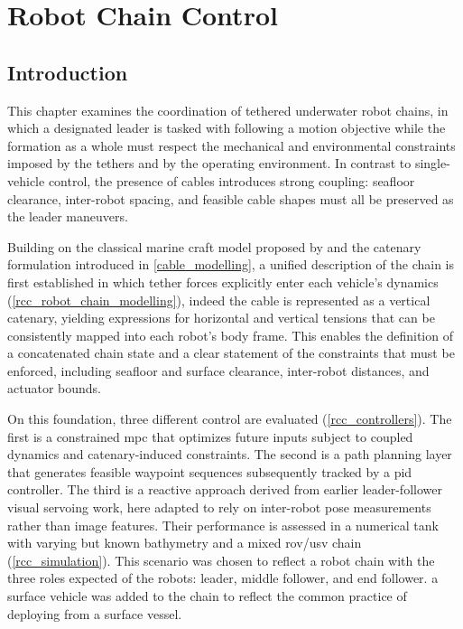 \chapter{Robot Chain Control}
\label{robot_chain_control}

\minitoc{}

\section{Introduction}
\label{rcc_introduction}

This chapter examines the coordination of tethered underwater robot chains, in which a designated
leader is tasked with following a motion objective while the formation as a whole must respect the
mechanical and environmental constraints imposed by the tethers and by the operating environment.
In contrast to single-vehicle control, the presence of cables introduces strong coupling: seafloor
clearance, inter-robot spacing, and feasible cable shapes must all be preserved as the leader
maneuvers.

Building on the classical marine craft model proposed by \cite{fossenHandbookMarineCraft2011} and
the catenary formulation introduced in \cref{cable_modelling}, a unified description of the chain
is first established in which tether forces explicitly enter each vehicle's dynamics
(\cref{rcc_robot_chain_modelling}), indeed the cable is represented as a vertical catenary,
yielding expressions for horizontal and vertical tensions that can be consistently mapped into each
robot's body frame. This enables the definition of a concatenated chain state and a clear statement
of the constraints that must be enforced, including seafloor and surface clearance, inter-robot
distances, and actuator bounds.

On this foundation, three different control are evaluated (\cref{rcc_controllers}). The first is a
constrained \ac{mpc} that optimizes future inputs subject to coupled dynamics and catenary-induced
constraints. The second is a path planning layer that generates feasible waypoint sequences
subsequently tracked by a \ac{pid} controller. The third is a reactive approach derived from
earlier leader-follower visual servoing work, here adapted to rely on inter-robot pose measurements
rather than image features. Their performance is assessed in a numerical tank with varying but
known bathymetry and a mixed \ac{rov}/\ac{usv} chain (\cref{rcc_simulation}). This scenario was
chosen to reflect a robot chain with the three roles expected of the robots: leader, middle
follower, and end follower. a surface vehicle was added to the chain to reflect the common practice
of deploying from a surface vessel.

